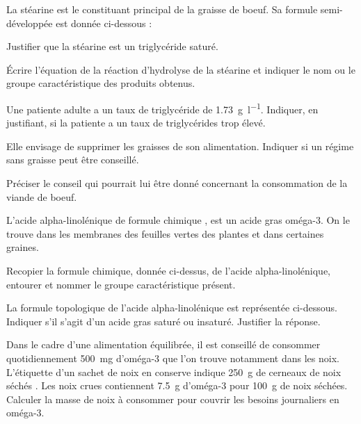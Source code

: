 \numeroQuestion
La stéarine est le constituant principal de la graisse de boeuf.
Sa formule semi-développée est donnée ci-dessous :
\begin{center}
\end{center}
Justifier que la stéarine est un triglycéride saturé.

\numeroQuestion
Écrire l'équation de la réaction d'hydrolyse de la stéarine et indiquer le nom ou le groupe
caractéristique des produits obtenus.

\numeroQuestion
Une patiente adulte a un taux de triglycéride de \qty{1,73}{\g\per\litre}.
Indiquer, en justifiant, si la patiente a un taux de triglycérides trop élevé.

\numeroQuestion
Elle envisage de supprimer les graisses de son alimentation.
Indiquer si un régime sans graisse peut être conseillé.

\numeroQuestion
Préciser le conseil qui pourrait lui être donné concernant la consommation de la viande de boeuf.

\numeroQuestion
L'acide alpha-linolénique de formule chimique , est un acide gras oméga-3.
On le trouve dans les membranes des feuilles vertes des plantes et dans certaines graines.

\numeroSousQuestion
Recopier la formule chimique, donnée ci-dessus, de l'acide alpha-linolénique,
entourer et nommer le groupe caractéristique présent.

\numeroSousQuestion
La formule topologique de l'acide alpha-linolénique est représentée ci-dessous.
Indiquer s'il s'agit d'un acide gras saturé ou insaturé. Justifier la réponse.

\begin{center}
\end{center}

\numeroQuestion
Dans le cadre d'une alimentation équilibrée, il est conseillé de consommer quotidiennement
\qty{500}{\milli\g} d'oméga-3 que l'on trouve notamment dans les noix.
L'étiquette d'un sachet de noix en conserve indique \og \qty{250}{\g} de cerneaux de noix séchés \fg.
Les noix crues contiennent \qty{7,5}{\g} d'oméga-3 pour \qty{100}{\g} de noix séchées.
Calculer la masse de noix à consommer pour couvrir les besoins journaliers en oméga-3.

